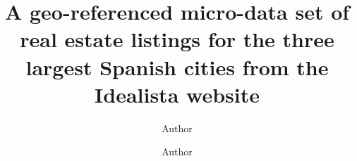 \documentclass[times,final]{elsarticle}
\begin{document}

\begin{frontmatter}

\title{A geo-referenced micro-data set of real estate listings for the three largest Spanish cities from the Idealista website}%

\author[1]{Author }
\author[2]{Author }





\end{frontmatter}
\end{document}
